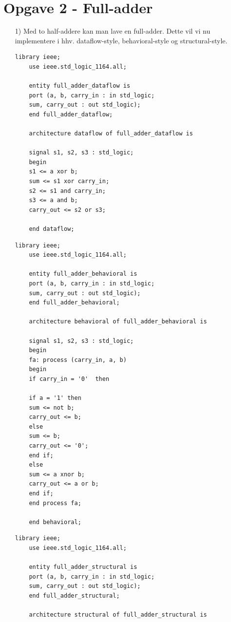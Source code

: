 
\section{Opgave 2 - Full-adder}
	\flushleft
\begin{enumerate}
	\item[1)]
	Med to half-addere kan man lave en full-adder. Dette vil vi nu implementere i hhv. dataflow-style, behavioral-style og structural-style.\\
	\medskip
	\begin{lstlisting}[caption={Full-adder Dataflow VHDL kode},label={lst:FaDataflowCode}]
	library ieee;
	use ieee.std_logic_1164.all;
	
	entity full_adder_dataflow is
	port (a, b, carry_in : in std_logic;
	sum, carry_out : out std_logic);
	end full_adder_dataflow;
	
	architecture dataflow of full_adder_dataflow is
	
	signal s1, s2, s3 : std_logic;
	begin
	s1 <= a xor b; 
	sum <= s1 xor carry_in;
	s2 <= s1 and carry_in;
	s3 <= a and b;
	carry_out <= s2 or s3;
	
	end dataflow;
	\end{lstlisting}
	\medskip
	\begin{lstlisting}[caption={Full-adder Behavioral VHDL kode}, label={lst:FaBehavioralCode}]
	library ieee;
	use ieee.std_logic_1164.all;
	
	entity full_adder_behavioral is
	port (a, b, carry_in : in std_logic;
	sum, carry_out : out std_logic);
	end full_adder_behavioral;
	
	architecture behavioral of full_adder_behavioral is
	
	signal s1, s2, s3 : std_logic;
	begin
	fa: process (carry_in, a, b)
	begin
	if carry_in = '0'  then
	
	if a = '1' then
	sum <= not b;
	carry_out <= b;
	else
	sum <= b;
	carry_out <= '0';
	end if;
	else 
	sum <= a xnor b;
	carry_out <= a or b;
	end if;
	end process fa;
	
	end behavioral;
	\end{lstlisting}
	\medskip
	\begin{lstlisting}[caption={Full-adder Structural VHDL kode},label={lst:FaStructuralCode}]
	library ieee;
	use ieee.std_logic_1164.all;
	
	entity full_adder_structural is
	port (a, b, carry_in : in std_logic;
	sum, carry_out : out std_logic);
	end full_adder_structural;
	
	architecture structural of full_adder_structural is
	

\end{lstlisting}
\end{enumerate}
